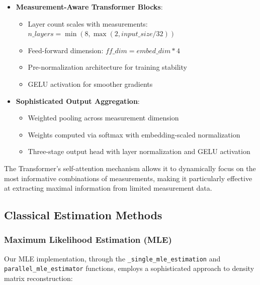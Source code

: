 \documentclass{optica-article}
\begin{document}
\begin{itemize}
\item \textbf{Measurement-Aware Transformer Blocks}:
\begin{itemize}
\item Layer count scales with measurements: $n\_layers = \min(8, \max(2, input\_size / 32))$
\item Feed-forward dimension: $ff\_dim = embed\_dim * 4$
\item Pre-normalization architecture for training stability
\item GELU activation for smoother gradients
\end{itemize}

\item \textbf{Sophisticated Output Aggregation}:
\begin{itemize}
\item Weighted pooling across measurement dimension
\item Weights computed via softmax with embedding-scaled normalization
\item Three-stage output head with layer normalization and GELU activation
\end{itemize}
\end{itemize}

The Transformer's self-attention mechanism allows it to dynamically focus on the most informative combinations of measurements, making it particularly effective at extracting maximal information from limited measurement data.

\subsection{Classical Estimation Methods}

\subsubsection{Maximum Likelihood Estimation (MLE)}

Our MLE implementation, through the \texttt{\_single\_mle\_estimation} and \texttt{parallel\_mle\_estimator} functions, employs a sophisticated approach to density matrix reconstruction:
\end{document}
